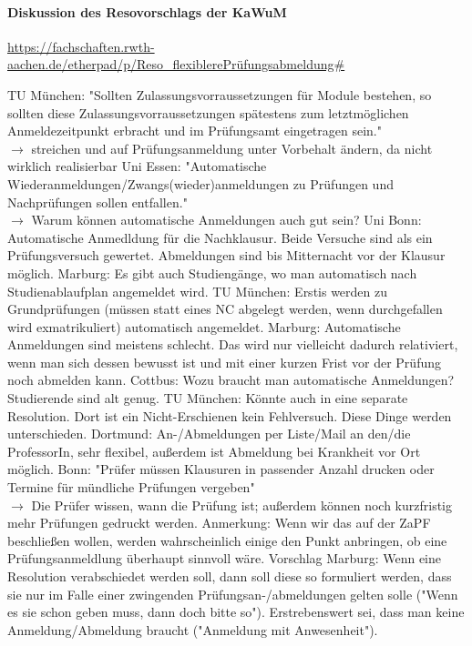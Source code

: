    \paragraph{Diskussion des Resovorschlags der KaWuM}
      \url{https://fachschaften.rwth-aachen.de/etherpad/p/Reso_flexiblerePrüfungsabmeldung#}
      \begin{outline}
        \1 TU München: "Sollten Zulassungsvorraussetzungen für Module bestehen, so sollten diese Zulassungsvorraussetzungen spätestens zum letztmöglichen Anmeldezeitpunkt erbracht und im Prüfungsamt eingetragen sein." \\
          $\rightarrow$ streichen und auf Prüfungsanmeldung unter Vorbehalt ändern, da nicht wirklich realisierbar
        \1 Uni Essen: "Automatische Wiederanmeldungen/Zwangs(wieder)anmeldungen zu Prüfungen und Nachprüfungen sollen entfallen." \\
          $\rightarrow$ Warum können automatische Anmeldungen auch gut sein?
          \2 Uni Bonn: Automatische Anmedldung für die Nachklausur. Beide Versuche sind als ein Prüfungsversuch gewertet. Abmeldungen sind bis Mitternacht vor der Klausur möglich.
          \2 Marburg: Es gibt auch Studiengänge, wo man automatisch nach Studienablaufplan angemeldet wird.
          \2 TU München: Erstis werden zu Grundprüfungen (müssen statt eines NC abgelegt werden, wenn durchgefallen wird exmatrikuliert) automatisch angemeldet.
          \2 Marburg: Automatische Anmeldungen sind meistens schlecht. Das wird nur vielleicht dadurch relativiert, wenn man sich dessen bewusst ist und mit einer kurzen Frist vor der Prüfung noch abmelden kann.
          \2 Cottbus: Wozu braucht man automatische Anmeldungen? Studierende sind alt genug.
          \2 TU München: Könnte auch in eine separate Resolution. Dort ist ein Nicht-Erschienen kein Fehlversuch. Diese Dinge werden unterschieden.
          \2 Dortmund: An-/Abmeldungen per Liste/Mail an den/die ProfessorIn, sehr flexibel, außerdem ist Abmeldung bei Krankheit vor Ort möglich.
        \1 Bonn: "Prüfer müssen Klausuren in passender Anzahl drucken oder Termine für mündliche Prüfungen vergeben" \\
          $\rightarrow$ Die Prüfer wissen, wann die Prüfung ist; außerdem können noch kurzfristig mehr Prüfungen gedruckt werden.
        \1 Anmerkung: Wenn wir das auf der ZaPF beschließen wollen, werden wahrscheinlich einige den Punkt anbringen, ob eine Prüfungsanmeldlung überhaupt sinnvoll wäre.
        \1 Vorschlag Marburg: Wenn eine Resolution verabschiedet werden soll, dann soll diese so formuliert werden, dass sie nur im Falle einer zwingenden Prüfungsan-/abmeldungen gelten solle ("Wenn es sie schon geben muss, dann doch bitte so"). Erstrebenswert sei, dass man keine Anmeldung/Abmeldung braucht ("Anmeldung mit Anwesenheit").

\end{outline}
